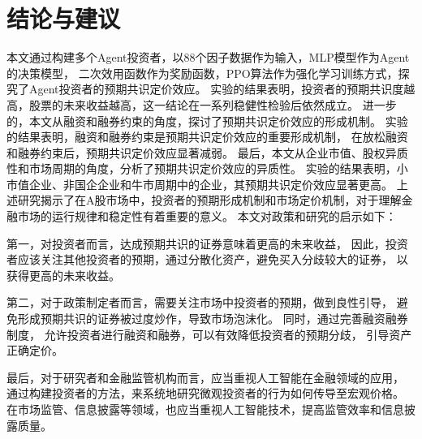 
\chapter{结论与建议}

本文通过构建多个Agent投资者，以88个因子数据作为输入，MLP模型作为Agent的决策模型，
二次效用函数作为奖励函数，PPO算法作为强化学习训练方式，探究了Agent投资者的预期共识定价效应。
实验的结果表明，投资者的预期共识度越高，股票的未来收益越高，这一结论在一系列稳健性检验后依然成立。
进一步的，本文从融资和融券约束的角度，探讨了预期共识定价效应的形成机制。
实验的结果表明，融资和融券约束是预期共识定价效应的重要形成机制，
在放松融资和融券约束后，预期共识定价效应显著减弱。
最后，本文从企业市值、股权异质性和市场周期的角度，分析了预期共识定价效应的异质性。
实验的结果表明，小市值企业、非国企企业和牛市周期中的企业，其预期共识定价效应显著更高。
上述研究揭示了在A股市场中，投资者的预期形成机制和市场定价机制，对于理解金融市场的运行规律和稳定性有着重要的意义。
本文对政策和研究的启示如下：

第一，对投资者而言，达成预期共识的证券意味着更高的未来收益，
因此，投资者应该关注其他投资者的预期，通过分散化资产，避免买入分歧较大的证券，
以获得更高的未来收益。

第二，对于政策制定者而言，需要关注市场中投资者的预期，做到良性引导，
避免形成预期共识的证券被过度炒作，导致市场泡沫化。
同时，通过完善融资融券制度，
允许投资者进行融资和融券，可以有效降低投资者的预期分歧，
引导资产正确定价。

最后，对于研究者和金融监管机构而言，应当重视人工智能在金融领域的应用，
通过构建投资者的方法，来系统地研究微观投资者的行为如何传导至宏观价格。
在市场监管、信息披露等领域，也应当重视人工智能技术，提高监管效率和信息披露质量。
